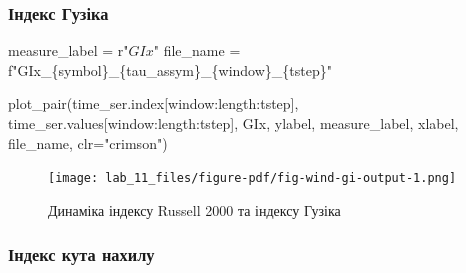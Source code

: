 \documentclass[
  letterpaper,
]{report}
\newenvironment{Shaded}{\begin{snugshade}}{\end{snugshade}}
\newcommand{\NormalTok}[1]{\textcolor[rgb]{0.00,0.23,0.31}{#1}}
\newcommand{\OperatorTok}[1]{\textcolor[rgb]{0.37,0.37,0.37}{#1}}
\newcommand{\SpecialCharTok}[1]{\textcolor[rgb]{0.37,0.37,0.37}{#1}}
\newcommand{\SpecialStringTok}[1]{\textcolor[rgb]{0.13,0.47,0.30}{#1}}
\newcommand{\StringTok}[1]{\textcolor[rgb]{0.13,0.47,0.30}{#1}}
\newcommand{\VerbatimStringTok}[1]{\textcolor[rgb]{0.13,0.47,0.30}{#1}}
\begin{document}
\hypertarget{ux456ux43dux434ux435ux43aux441-ux433ux443ux437ux456ux43aux430}{%
\subsubsection{Індекс
Гузіка}\label{ux456ux43dux434ux435ux43aux441-ux433ux443ux437ux456ux43aux430}}

\begin{Shaded}
\begin{Highlighting}[]
\NormalTok{measure\_label }\OperatorTok{=} \VerbatimStringTok{r"$GIx$"}
\NormalTok{file\_name }\OperatorTok{=} \SpecialStringTok{f"GIx\_}\SpecialCharTok{\{}\NormalTok{symbol}\SpecialCharTok{\}}\SpecialStringTok{\_}\SpecialCharTok{\{}\NormalTok{tau\_assym}\SpecialCharTok{\}}\SpecialStringTok{\_}\SpecialCharTok{\{}\NormalTok{window}\SpecialCharTok{\}}\SpecialStringTok{\_}\SpecialCharTok{\{}\NormalTok{tstep}\SpecialCharTok{\}}\SpecialStringTok{"}
\end{Highlighting}
\end{Shaded}

\begin{Shaded}
\begin{Highlighting}[]
\NormalTok{plot\_pair(time\_ser.index[window:length:tstep],}
\NormalTok{          time\_ser.values[window:length:tstep],}
\NormalTok{          GIx, }
\NormalTok{          ylabel, }
\NormalTok{          measure\_label,}
\NormalTok{          xlabel,}
\NormalTok{          file\_name, }
\NormalTok{          clr}\OperatorTok{=}\StringTok{"crimson"}\NormalTok{)}
\end{Highlighting}
\end{Shaded}

\begin{figure}[H]

{\centering \texttt{[image: lab\_11\_files/figure-pdf/fig-wind-gi-output-1.png]}

}

\caption{\label{fig-wind-gi}Динаміка індексу Russell 2000 та індексу
Гузіка}

\end{figure}

\hypertarget{ux456ux43dux434ux435ux43aux441-ux43aux443ux442ux430-ux43dux430ux445ux438ux43bux443}{%
\subsubsection{Індекс кута
нахилу}\label{ux456ux43dux434ux435ux43aux441-ux43aux443ux442ux430-ux43dux430ux445ux438ux43bux443}}
\end{document}
